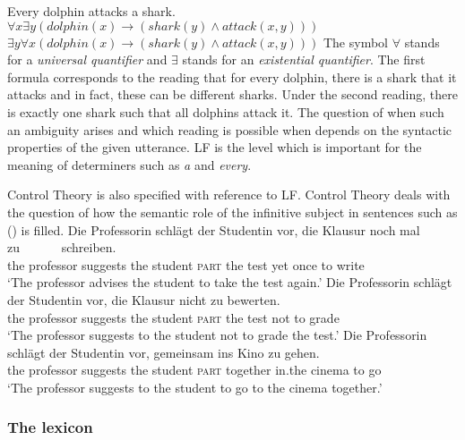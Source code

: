 \eal
\label{Beispiel-Every-man-loves-a-woman}
\ex Every dolphin attacks a shark.
\ex $\forall x \exists y (dolphin(x) \to (shark(y) \wedge attack(x,y)))$
\ex $\exists y \forall x (dolphin(x) \to (shark(y) \wedge attack(x,y)))$
\zl
The symbol $\forall$\is{$\forall$} stands for a \emph{universal quantifier} and $\exists$\is{$\exists$} stands for an
\emph{existential quantifier}. The first formula corresponds to the reading that for every dolphin, there is a shark that it attacks
and in fact, these can be different sharks. Under the second reading, there is exactly one shark such that all dolphins attack it. The question of when such an
ambiguity arises and which reading is possible when depends on the syntactic properties of the given utterance. LF is the level which is important for the
meaning of determiners such as \emph{a} and \emph{every}.

Control Theory is also specified with reference to LF. Control Theory deals with the question of how the semantic role of the infinitive
subject in sentences such as () is filled.
\eal
\ex 
\gll Die Professorin schlägt  der Studentin vor,          die Klausur noch mal  zu~~~~~~ schreiben.\\
     the professor   suggests the student   \textsc{part} the test    yet  once to write\\
\glt `The professor advises the student to take the test again.'
\ex 
\gll Die Professorin schlägt der Studentin vor, die Klausur nicht zu bewerten.\\
	 the professor suggests the student \textsc{part} the test not to grade\\
\glt `The professor suggests to the student not to grade the test.'
\ex 
\gll Die Professorin schlägt  der Studentin vor,          gemeinsam ins    Kino   zu gehen.\hspace{-3pt}\\
     the professor   suggests the student   \textsc{part} together  in.the cinema to go\\
\glt `The professor suggests to the student to go to the cinema together.'
\zl
{}

\subsubsection{The lexicon}
\label{Abschnitt-GB-Lexikon}

